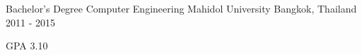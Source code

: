 

\begin{cventries}

  \cventry
    {Bachelor's Degree Computer Engineering} %
    {Mahidol University} %
    {Bangkok, Thailand} %
    {2011 - 2015} %
    {
      \begin{cvitems} %
        \item {GPA 3.10}
      \end{cvitems}
    }

\end{cventries}
